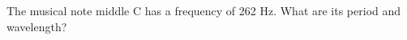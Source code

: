 The musical note middle C has a frequency of 262 Hz.
What are its period and wavelength?\answercheck
